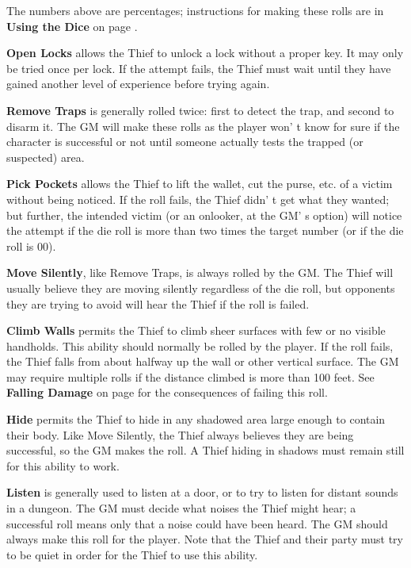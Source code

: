 \documentclass[a4paper,twoside,openany,10pt]{book}
\begin{document}
\begin{multicols}{2}
	


The numbers above are percentages; instructions for making these rolls are in \textbf{Using the Dice} on page \hyperlink{using-the-dice}{\pageref{using-the-dice}}.

\textbf{Open Locks }allows the Thief to unlock a lock without a proper key. It may only be tried once per lock. If the attempt fails, the Thief must wait until they have gained another level of experience before trying again.

\textbf{Remove Traps }is generally rolled twice: first to detect the trap, and second to disarm it. The GM will make these rolls as the player won' t know for sure if the character is successful or not until someone actually tests the trapped (or suspected) area.

\textbf{Pick Pockets }allows the Thief to lift the wallet, cut the purse, etc. of a victim without being noticed. If the roll fails, the Thief didn' t get what they wanted; but further, the intended victim (or an onlooker, at the GM' s option) will notice the attempt if the die roll is more than two times the target number (or if the die roll is 00).

\textbf{Move Silently}, like Remove Traps, is always rolled by the GM. The Thief will usually believe they are moving silently regardless of the die roll, but opponents they are trying to avoid will hear the Thief if the roll is failed.

\textbf{Climb Walls} permits the Thief to climb sheer surfaces with few or no visible handholds. This ability should normally be rolled by the player. If the roll fails, the Thief falls from about halfway up the wall or other vertical surface. The GM may require multiple rolls if the distance climbed is more than 100 feet. See \textbf{Falling Damage }on page \hyperlink{falling-damage}{\pageref{falling-damage}} for the consequences of failing this roll.

\textbf{Hide} permits the Thief to hide in any shadowed area large enough to contain their body. Like Move Silently, the Thief always believes they are being successful, so the GM makes the roll. A Thief hiding in shadows must remain still for this ability to work.

\textbf{Listen} is generally used to listen at a door, or to try to listen for distant sounds in a dungeon. The GM must decide what noises the Thief might hear; a successful roll means only that a noise could have been heard. The GM should always make this roll for the player. Note that the Thief and their party must try to be quiet in order for the Thief to use this ability.


\end{multicols}
\end{document}
